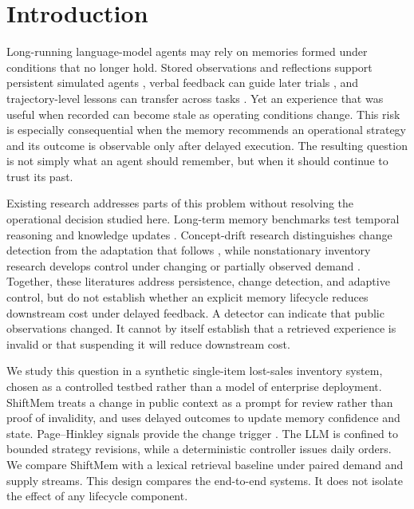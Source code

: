 \section{Introduction}
\label{sec:introduction}

Long-running language-model agents may rely on memories formed under conditions
that no longer hold. Stored observations and reflections support persistent
simulated agents \citep{park2023generative}, verbal feedback can guide later
trials \citep{shinn2023reflexion}, and trajectory-level lessons can transfer
across tasks \citep{zhao2023expel}. Yet an experience that was useful when
recorded can become stale as operating conditions change. This risk is
especially consequential when the memory recommends an operational strategy and
its outcome is observable only after delayed execution. The resulting question
is not simply what an agent should remember, but when it should continue to
trust its past.

Existing research addresses parts of this problem without resolving the
operational decision studied here. Long-term memory benchmarks test temporal
reasoning and knowledge updates
\citep{maharana2024locomo,wu2025longmemeval}. Concept-drift research distinguishes
change detection from the adaptation that follows \citep{gama2014survey}, while
nonstationary inventory research develops control under changing or partially
observed demand \citep{treharne2002adaptive,bayraktar2010inventory}. Together,
these literatures address persistence, change detection, and adaptive control,
but do not establish whether an explicit memory lifecycle reduces downstream
cost under delayed feedback. A detector can indicate that public observations
changed. It cannot by itself establish that a
retrieved experience is invalid or that suspending it will reduce downstream
cost.

We study this question in a synthetic single-item lost-sales inventory system,
chosen as a controlled testbed rather than a model of enterprise deployment.
ShiftMem treats a change in public context as a prompt for review rather than
proof of invalidity, and uses delayed outcomes to update memory confidence and
state. Page--Hinkley signals provide the change trigger
\citep{page1954continuous}. The LLM is confined to bounded strategy revisions,
while a deterministic controller issues daily orders. We compare ShiftMem with
a lexical retrieval baseline under paired demand and supply streams. This design
compares the end-to-end systems. It does not isolate the effect of any lifecycle
component.

